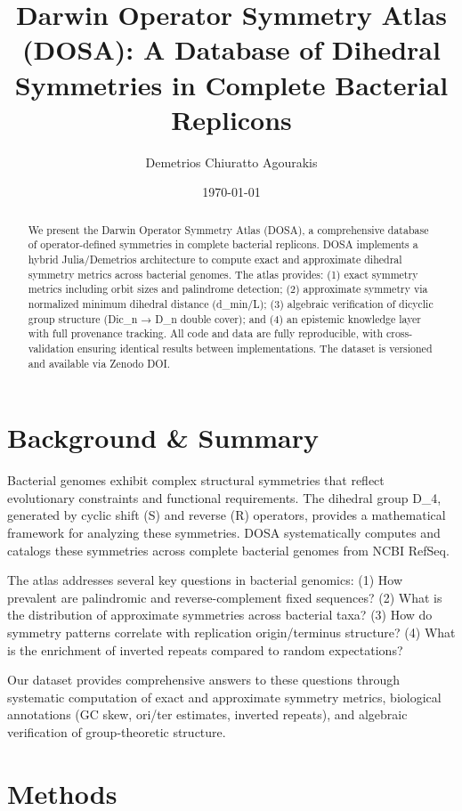 \documentclass[12pt,a4paper]{article}
\title{Darwin Operator Symmetry Atlas (DOSA): A Database of Dihedral Symmetries in Complete Bacterial Replicons}
\author{Demetrios Chiuratto Agourakis}
\date{\today}
\begin{document}
\maketitle

\begin{abstract}
We present the Darwin Operator Symmetry Atlas (DOSA), a comprehensive database of operator-defined symmetries in complete bacterial replicons. DOSA implements a hybrid Julia/Demetrios architecture to compute exact and approximate dihedral symmetry metrics across bacterial genomes. The atlas provides: (1) exact symmetry metrics including orbit sizes and palindrome detection; (2) approximate symmetry via normalized minimum dihedral distance (d\_min/L); (3) algebraic verification of dicyclic group structure (Dic\_n → D\_n double cover); and (4) an epistemic knowledge layer with full provenance tracking. All code and data are fully reproducible, with cross-validation ensuring identical results between implementations. The dataset is versioned and available via Zenodo DOI.
\end{abstract}

\section{Background \& Summary}

Bacterial genomes exhibit complex structural symmetries that reflect evolutionary constraints and functional requirements. The dihedral group D\_4, generated by cyclic shift (S) and reverse (R) operators, provides a mathematical framework for analyzing these symmetries. DOSA systematically computes and catalogs these symmetries across complete bacterial genomes from NCBI RefSeq.

The atlas addresses several key questions in bacterial genomics: (1) How prevalent are palindromic and reverse-complement fixed sequences? (2) What is the distribution of approximate symmetries across bacterial taxa? (3) How do symmetry patterns correlate with replication origin/terminus structure? (4) What is the enrichment of inverted repeats compared to random expectations?

Our dataset provides comprehensive answers to these questions through systematic computation of exact and approximate symmetry metrics, biological annotations (GC skew, ori/ter estimates, inverted repeats), and algebraic verification of group-theoretic structure.

\section{Methods}
\end{document}
